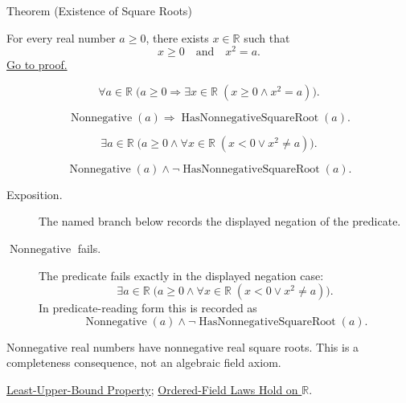 \begin{theorembox}{Theorem (Existence of Square Roots)}
\begin{theorem}
\label{thm:existence-of-square-roots}
For every real number $a\ge 0$, there exists $x\in\mathbb{R}$ such that
\[
x\ge 0
\quad\text{and}\quad
x^2=a.
\]
\hyperref[prf:existence-of-square-roots]{Go to proof.}
\end{theorem}
\end{theorembox}
\begin{remark*}
\[
\forall a\in\mathbb{R}\;
\bigl(a\ge 0\Rightarrow
\exists x\in\mathbb{R}\;(x\ge 0\land x^2=a)\bigr).
\]
\end{remark*}
\begin{remark*}
\[
\operatorname{Nonnegative}(a)\Rightarrow
\operatorname{HasNonnegativeSquareRoot}(a).
\]
\end{remark*}
\begin{remark*}
\[
\exists a\in\mathbb{R}\;
\bigl(a\ge 0\land
\forall x\in\mathbb{R}\;(x<0\lor x^2\ne a)\bigr).
\]
\end{remark*}
\begin{remark*}
\[
\operatorname{Nonnegative}(a)\land
\neg\operatorname{HasNonnegativeSquareRoot}(a).
\]
\end{remark*}

\begin{remark*}
\begin{description}
  \item[Exposition.] The named branch below records the displayed negation of the predicate.
  \item[\(\operatorname{Nonnegative}\) fails.] The predicate fails exactly in the displayed negation case:
  \[
  \exists a\in\mathbb{R}\;
  \bigl(a\ge 0\land
  \forall x\in\mathbb{R}\;(x<0\lor x^2\ne a)\bigr).
  \]
  In predicate-reading form this is recorded as
  \[
  \operatorname{Nonnegative}(a)\land
  \neg\operatorname{HasNonnegativeSquareRoot}(a).
  \]
\end{description}
\end{remark*}
\begin{remark*}[Interpretation]
Nonnegative real numbers have nonnegative real square roots. This is a
completeness consequence, not an algebraic field axiom.
\end{remark*}
\begin{dependencies}
\hyperref[thm:lub-property-r]{Least-Upper-Bound Property};
\hyperref[cor:ordered-field-laws-on-r]{Ordered-Field Laws Hold on $\mathbb{R}$}.
\end{dependencies}

